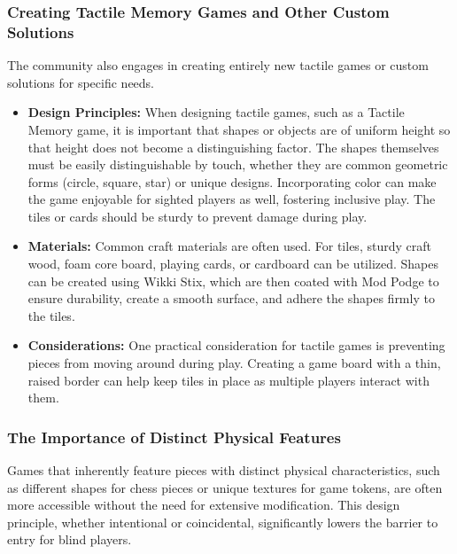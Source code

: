 \subsubsection{Creating Tactile Memory Games and Other Custom Solutions}

The community also engages in creating entirely new tactile games or custom solutions for specific needs.
\begin{itemize}
    \item \textbf{Design Principles:} When designing tactile games, such as a Tactile Memory game, it is important that shapes or objects are of uniform height so that height does not become a distinguishing factor\supercite{PathsToLiteracyMemoryGame}. The shapes themselves must be easily distinguishable by touch, whether they are common geometric forms (circle, square, star) or unique designs\supercite{PathsToLiteracyMemoryGame}. Incorporating color can make the game enjoyable for sighted players as well, fostering inclusive play\supercite{PathsToLiteracyMemoryGame}. The tiles or cards should be sturdy to prevent damage during play\supercite{PathsToLiteracyMemoryGame}.
    \item \textbf{Materials:} Common craft materials are often used. For tiles, sturdy craft wood, foam core board, playing cards, or cardboard can be utilized. Shapes can be created using Wikki Stix, which are then coated with Mod Podge to ensure durability, create a smooth surface, and adhere the shapes firmly to the tiles\supercite{PathsToLiteracyMemoryGame}.
    \item \textbf{Considerations:} One practical consideration for tactile games is preventing pieces from moving around during play. Creating a game board with a thin, raised border can help keep tiles in place as multiple players interact with them\supercite{PathsToLiteracyMemoryGame}.
\end{itemize}

\subsubsection{The Importance of Distinct Physical Features}

Games that inherently feature pieces with distinct physical characteristics, such as different shapes for chess pieces or unique textures for game tokens, are often more accessible without the need for extensive modification\supercite{NFBBoardGames}. This design principle, whether intentional or coincidental, significantly lowers the barrier to entry for blind players.

